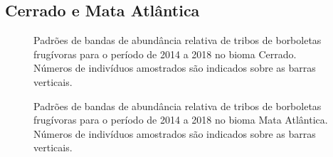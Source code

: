 \documentclass[
  letterpaper,
]{scrbook}
\begin{document}
\subsection{Cerrado e Mata Atlântica}\label{cerrado-e-mata-atluxe2ntica}

\begin{figure}[H]


\caption{\label{fig-regiao-cerrado}Padrões de bandas de abundância
relativa de tribos de borboletas frugívoras para o período de 2014 a
2018 no bioma Cerrado. Números de indivíduos amostrados são indicados
sobre as barras verticais.}

\end{figure}%

\begin{figure}[H]


\caption{\label{fig-regiao-mata\_atlantica}Padrões de bandas de
abundância relativa de tribos de borboletas frugívoras para o período de
2014 a 2018 no bioma Mata Atlântica. Números de indivíduos amostrados
são indicados sobre as barras verticais.}

\end{figure}%
\end{document}
